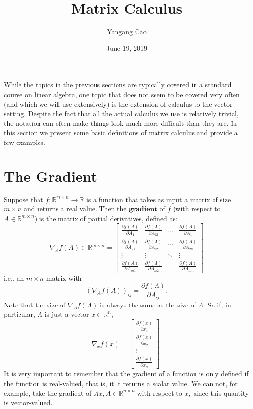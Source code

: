 \documentclass[10pt,a4paper,oneside]{article}
\author{Yangang Cao}
\date{June 19, 2019}
\begin{document}
\title{Matrix Calculus}
\maketitle
While the topics in the previous sections are typically covered in a standard course on linear algebra, one topic that does not seem to be covered very often (and which we will use extensively) is the extension of calculus to the vector setting. Despite the fact that all the actual calculus we use is relatively trivial, the notation can often make things look much more difficult than they are. In this section we present some basic definitions of matrix calculus and provide a few examples. 
\section{The Gradient}
 Suppose that $f : \mathbb{R}^{m \times n} \rightarrow \mathbb{R}$ is a function that takes as input a matrix of size $m \times n$ and returns a real value. Then the $\bm{gradient}$ of $f$ (with respect to  $A \in \mathbb{R}^{m \times n}$) is the matrix of partial derivatives, defined as:
 \[
 \nabla_{A} f(A) \in \mathbb{R}^{m \times n}=\left[\begin{array}{cccc}{\frac{\partial f(A)}{\partial A_{1}}} & {\frac{\partial f(A)}{\partial A_{12}}} & {\dots} & {\frac{\partial f(A)}{\partial A_{1}}} \\ {\frac{\partial f(A)}{\partial A_{21}}} & {\frac{\partial f(A)}{\partial A_{22}}} & {\cdots} & {\frac{\partial f(A)}{\partial A_{2 n}}} \\ {\vdots} & {\vdots} & {\ddots} & {\vdots} \\ {\frac{\partial f(A)}{\partial A_{m 1}}} & {\frac{\partial f(A)}{\partial A_{m 2}}} & {\cdots} & {\frac{\partial f(A)}{\partial A_{m n}}}\end{array}\right]
 \]
 i.e., an $m\times n$ matrix with
 \[
 \left(\nabla_{A} f(A)\right)_{i j}=\frac{\partial f(A)}{\partial A_{i j}}.
 \]
Note that the size of \(\nabla_{A} f(A)\) is always the same as the size of \(A .\) So if, in particular, \(A\) is just a vector \(x \in \mathbb{R}^{n}\),
\[
\nabla_{x} f(x)=\left[\begin{array}{c}{\frac{\partial f(x)}{\partial x_{1}}} \\ {\frac{\partial f(x)}{\partial x_{2}}} \\ {\vdots} \\ {\frac{\partial f(x)}{\partial x_{n}}}\end{array}\right].
\]
It is very important to remember that the gradient of a function is only defined if the function
is real-valued, that is, it it returns a scalar value. We can not, for example, take the gradient
of \(A x, A \in \mathbb{R}^{n \times n}\) with respect to \(x,\) since this quantity is vector-valued.
\end{document}
